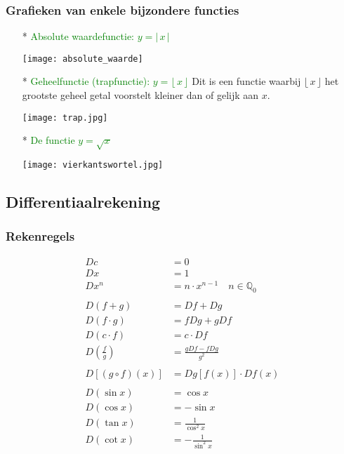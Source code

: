 \hypertarget{bijzondere_functies}{}
\subsubsection{Grafieken van enkele bijzondere functies} \label{bijzondere_functies}

\begin{itemize}
\item[*] \textcolor{green}{\hypertarget{absolute_waardefunctie}{Absolute waardefunctie: $y=|\,x\,|$}} \label{absolute_waardefunctie}
  \begin{center}
  \texttt{[image: absolute\_waarde]}
  \end{center}
\item[*] \textcolor{green}{Geheelfunctie (\hypertarget{trapfunctie}{trapfunctie}): $y=\lfloor\,x\,\rfloor$} \label{trapfunctie}\newline
  Dit is een functie waarbij $\lfloor\,x\,\rfloor$ het grootste geheel getal voorstelt kleiner dan of gelijk aan $x$.
  \begin{center}
  \texttt{[image: trap.jpg]}
  \end{center}
\item[*] \textcolor{green}{De functie \hypertarget{vierkantswortel}{$y=\sqrt{x}$}} \label{vierkantswortel}
  \begin{center}
  \texttt{[image: vierkantswortel.jpg]}
  \end{center}
\end{itemize}

\subsection{Differentiaalrekening}

\subsubsection{Rekenregels} \label{rekenregels_afgeleiden}

\begin{align*}
  Dc &= 0\\
  Dx &= 1\\
  Dx^n &= n\cdot x^{n-1}\quad n\in \mathbb{Q}_0\\
  \\
  D(f+g) &= Df + Dg\\
  D(f\cdot g) &= fDg + gDf\\
  D(c\cdot f) &= c\cdot Df\\
  D\left(\frac{f}{g}\right) &= \frac{gDf-fDg}{g^2}\\
  \\
  D\left[\left(g\circ f\right)(x)\right] &= Dg\left[f(x)\right]\cdot Df(x)\\
  \\
  D(\sin x) &= \cos x\\
  D(\cos x) &= -\sin x\\
  D(\tan x) &= \frac{1}{\cos^2 x}\\
  D(\cot x) &= -\frac{1}{\sin^2 x}\\
\end{align*}

